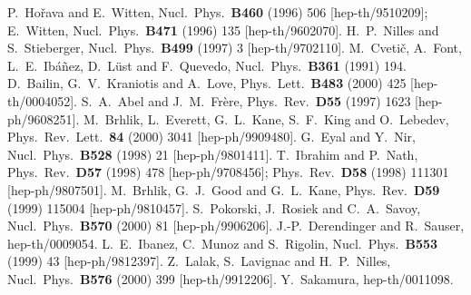 \documentclass[a4paper,12pt]{article}
\begin{document}
\begin{thebibliography}{99}
	P.~Ho\v rava and E.~Witten,
	Nucl.\ Phys.\ {\bf B460} (1996) 506 [hep-th/9510209];
	E.~Witten,
	Nucl.\ Phys.\ {\bf B471} (1996) 135 [hep-th/9602070].
	H.~P.~Nilles and S.~Stieberger,
	Nucl.\ Phys.\ {\bf B499} (1997) 3 [hep-th/9702110].
	M.~Cveti\v c, A.~Font, L.~E.~Ib\'a\~nez, D.~L\"ust and F.~Quevedo,
	Nucl.\ Phys.\ {\bf B361} (1991) 194.
	D.~Bailin, G.~V.~Kraniotis and A.~Love,
	Phys.\ Lett.\ {\bf B483} (2000) 425 [hep-th/0004052].
	S.~A.~Abel and J.~M.~Fr\`ere,
	Phys.\ Rev.\ {\bf D55} (1997) 1623 [hep-ph/9608251]. 
	M.~Brhlik, L.~Everett, G.~L.~Kane, S.~F.~King and O.~Lebedev,
	Phys.\ Rev.\ Lett.\ {\bf 84} (2000) 3041 [hep-ph/9909480].
	G.~Eyal and Y.~Nir,
	Nucl.\ Phys.\ {\bf B528} (1998) 21 [hep-ph/9801411].
	T.~Ibrahim and P.~Nath,
	Phys.\ Rev.\ {\bf D57} (1998) 478 [hep-ph/9708456];
	Phys.\ Rev.\ {\bf D58} (1998) 111301 [hep-ph/9807501].
	M.~Brhlik, G.~J.~Good and G.~L.~Kane,
	Phys.\ Rev.\ {\bf D59} (1999) 115004 [hep-ph/9810457].
	S.~Pokorski, J.~Rosiek and C.~A.~Savoy,
	Nucl.\ Phys.\ {\bf B570} (2000) 81 [hep-ph/9906206].
	J.-P.~Derendinger and R.~Sauser,
hep-th/0009054.
	L.~E.~Ibanez, C.~Munoz and S.~Rigolin,
	Nucl.\ Phys.\ {\bf B553} (1999) 43 [hep-ph/9812397].
	Z.~Lalak, S.~Lavignac and H.~P.~Nilles,
	Nucl.\ Phys.\ {\bf B576} (2000) 399 [hep-th/9912206].
	Y.~Sakamura,
	hep-th/0011098.
\end{thebibliography}
\end{document}
